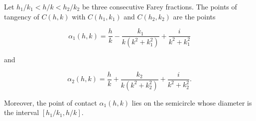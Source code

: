 Let $h_1/k_1 < h/k < h_2/k_2$ be three consecutive Farey fractions. The points of tangency of $C(h, k)$ with $C(h_1, k_1)$ and $C(h_2, k_2)$ are the points

$$\alpha_1(h, k) = \frac{h}{k} - \frac{k_1}{k(k^2 + k_1^2)} + \frac{i}{k^2 + k_1^2}$$

and

$$\alpha_2(h, k) = \frac{h}{k} + \frac{k_2}{k(k^2 + k_2^2)} + \frac{i}{k^2 + k_2^2}.$$

Moreover, the point of contact $\alpha_1(h, k)$ lies on the semicircle whose diameter is the interval $[h_1/k_1, h/k]$.
